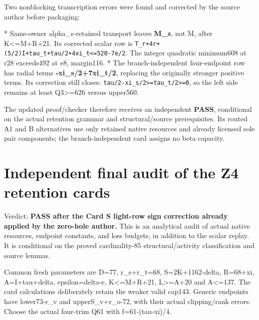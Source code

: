 \documentclass[10pt,a4paper]{article}
\theoremstyle{definition}
\begin{document}
Two nonblocking transcription errors were found and corrected by the
source author before packaging:

* Same-owner alpha\_\allowbreak{}s-retained transport leaves \textbf{M\_\allowbreak{}s},\allowbreak{} not M,\allowbreak{}
after K\textless=\allowbreak{}M+\allowbreak{}R+\allowbreak{}21. Its corrected scalar row is
\texttt{T\_\allowbreak{}\allowbreak{}r+\allowbreak{}4r+\allowbreak{}(5/\allowbreak{}2)I+\allowbreak{}tau\_\allowbreak{}\allowbreak{}t+\allowbreak{}tau/\allowbreak{}2+\allowbreak{}4xi\_\allowbreak{}\allowbreak{}t<=\allowbreak{}520-7e/\allowbreak{}2}.
The integer quadratic minimum608 at r28 exceeds492 at e8,\allowbreak{} margin116. *
The branch-independent four-endpoint row has radial terms
\textbf{-xi\_\allowbreak{}s/2+\allowbreak{}7xi\_\allowbreak{}t/2},\allowbreak{} replacing the originally stronger positive
terms. Its correction still closes:
\texttt{tau/\allowbreak{}2-xi\_\allowbreak{}\allowbreak{}s/\allowbreak{}2>=\allowbreak{}tau\_\allowbreak{}\allowbreak{}t/\allowbreak{}2>=\allowbreak{}0},\allowbreak{} so the left side
remains at least Q3\textgreater=\allowbreak{}626 versus upper560.

The updated proof/checker therefore receives an independent
\textbf{PASS},\allowbreak{} conditional on the actual retention grammar and
structural/source prerequisites. Its routed A1 and B alternatives use
only retained native resources and already licensed sole pair
components; the branch-independent card assigns no beta capacity.

\clearpage
\fontsize{9.5}{11.4}\selectfont\setlength{\parskip}{0.15em}
\hypertarget{independent-final-audit-of-the-z4-retention-cards}{%
\section{Independent final audit of the Z4 retention
cards}\label{independent-final-audit-of-the-z4-retention-cards}}

Verdict: \textbf{PASS after the Card S light-row sign correction already
applied by the zero-hole author.} This is an analytical audit of actual
native resources,\allowbreak{} endpoint constants,\allowbreak{} and loss budgets,\allowbreak{} in addition to
the scalar replay. It is conditional on the proved cardinality-85
structural/activity classification and source lemmas.

Common fresh parameters are \textbar D\textbar=\allowbreak{}77,\allowbreak{} r\_\allowbreak{}s+\allowbreak{}r\_\allowbreak{}t=\allowbreak{}68,\allowbreak{}
S=\allowbreak{}2K+\allowbreak{}1162-delta,\allowbreak{} R=\allowbreak{}68+\allowbreak{}xi,\allowbreak{} A=\allowbreak{}I+\allowbreak{}tau+\allowbreak{}delta,\allowbreak{} epsilon=\allowbreak{}delta-e,\allowbreak{}
K\textless=\allowbreak{}M+\allowbreak{}R+\allowbreak{}21,\allowbreak{} L\textgreater=\allowbreak{}A+\allowbreak{}20 and A\textless=\allowbreak{}137. The card
calculations deliberately retain the weaker valid cap143. Generic
endpoints have lower73-r\_\allowbreak{}v and upperS\_\allowbreak{}v+\allowbreak{}r\_\allowbreak{}o-72,\allowbreak{} with their actual
clipping/rank errors. Choose the actual four-trim Q61 with
f=\allowbreak{}61-(tau-xi)/4.
\end{document}
